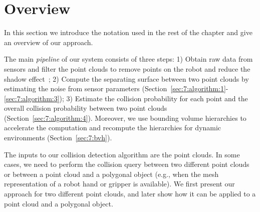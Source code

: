 \section{Overview}
\label{sec:7:overview}
In this section we introduce the notation used in the rest of the chapter and give an overview of our approach.

The main \emph{pipeline} of our system
consists of three steps: 1) Obtain raw data from sensors and filter the point clouds to remove points on the robot and reduce the shadow effect~\cite{Ioan:2010}; 2) Compute the separating surface between two point clouds by estimating the noise from sensor parameters (Section~\ref{sec:7:algorithm:1}-\ref{sec:7:algorithm:3}); 3) Estimate the collision probability for each point and the overall collision probability between two point clouds (Section~\ref{sec:7:algorithm:4}). Moreover, we use bounding volume hierarchies to accelerate the computation and recompute the hierarchies for dynamic environments (Section~\ref{sec:7:bvh}).

The inputs to our collision detection algorithm are the point clouds. In some cases, we need to perform
the collision query between two different point clouds or between a point cloud and a polygonal object (e.g., when the mesh representation of a robot hand or gripper is available). We first present our
approach for two different point clouds, and later show how it can be applied to a point cloud and a polygonal object.

